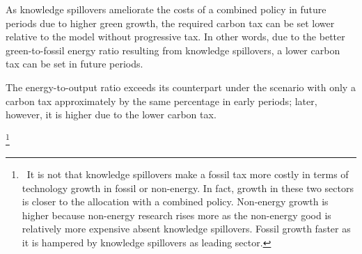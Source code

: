 As knowledge spillovers ameliorate the costs of a combined policy in future periods due to higher green growth, the required carbon tax can be set lower relative to the model without progressive tax. In other words, due to the better green-to-fossil energy ratio resulting from knowledge spillovers, a lower carbon tax can be set in future periods. 

The energy-to-output ratio exceeds its counterpart under the scenario with only a carbon tax approximately by the same percentage in early periods; later, however, it is higher due to the lower carbon tax. 
 
\footnote{\ 
It is not that knowledge spillovers make a fossil tax more costly in terms of technology growth in fossil or non-energy. In fact, growth in these two sectors is closer to the allocation with a combined policy.   Non-energy growth is higher because non-energy research rises more as the non-energy good is relatively more expensive absent knowledge spillovers. Fossil growth faster as it is hampered by knowledge spillovers as leading sector.}

